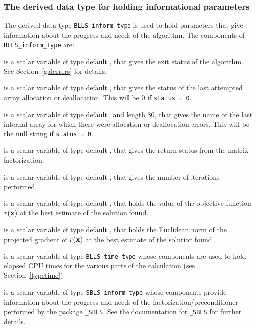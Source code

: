 \documentclass{galahad}
\newcommand{\packagename}{BLLS}
\begin{document}

\subsubsection{The derived data type for holding informational
 parameters}\label{typeinform}
The derived data type
{\tt \packagename\_inform\_type}
is used to hold parameters that give information about the progress and needs
of the algorithm. The components of
{\tt \packagename\_inform\_type}
are:

\begin{description}

 is a scalar variable of type default \integer, that gives the
exit status of the algorithm.
See Section~\ref{galerrors}
for details.

 is a scalar variable of type default \integer, that gives
the status of the last attempted array allocation or deallocation.
This will be 0 if {\tt status = 0}.

 is a scalar variable of type default \character\
and length 80, that  gives the name of the last internal array
for which there were allocation or deallocation errors.
This will be the null string if {\tt status = 0}.

 is a scalar variable of type default \integer, that
gives the return status from the matrix factorization.

 is a scalar variable of type default \integer, that
gives the number of iterations performed.

 is a scalar variable of type default \realdp, that holds the
value of the objective function $r({\mathbf{x}})$ at the best estimate of the 
solution found.

 is a scalar variable of type default \realdp, that holds the
Euclidean norm of the projected gradient of $r({\mathbf{x}})$ at the best 
estimate of the solution found.

 is a scalar variable of type {\tt \packagename\_time\_type}
whose components are used to hold elapsed CPU times for the various parts
of the calculation (see Section~\ref{typetime}).

 is a scalar variable of type
{\tt SBLS\_inform\_type} %
whose components provide information about the progress and needs
of the factorization/preconditioner
performed by the package
{\tt \libraryname\_SBLS}.
See the documentation for {\tt \libraryname\_SBLS} for further details.

\end{description}
\end{document}
